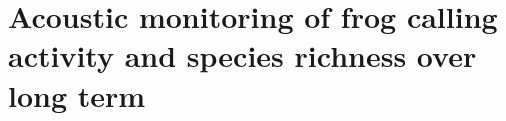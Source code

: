 
\chapter{Acoustic monitoring of frog calling activity and species richness over long term}
\label{cha:cha8Application}

%
%
%
%
%
%
%
